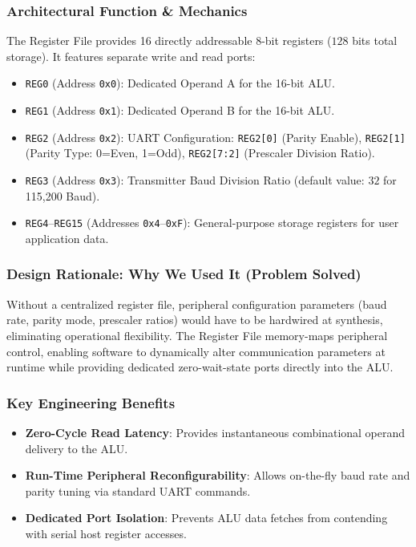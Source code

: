 \documentclass[11pt,a4paper]{article}
\begin{document}
\subsubsection{Architectural Function \& Mechanics}
The Register File provides 16 directly addressable 8-bit registers ($128$ bits total storage). It features separate write and read ports:
\begin{itemize}
    \item \texttt{REG0} (Address \texttt{0x0}): Dedicated Operand A for the 16-bit ALU.
    \item \texttt{REG1} (Address \texttt{0x1}): Dedicated Operand B for the 16-bit ALU.
    \item \texttt{REG2} (Address \texttt{0x2}): UART Configuration: \texttt{REG2[0]} (Parity Enable), \texttt{REG2[1]} (Parity Type: 0=Even, 1=Odd), \texttt{REG2[7:2]} (Prescaler Division Ratio).
    \item \texttt{REG3} (Address \texttt{0x3}): Transmitter Baud Division Ratio (default value: $32$ for 115,200 Baud).
    \item \texttt{REG4}--\texttt{REG15} (Addresses \texttt{0x4}--\texttt{0xF}): General-purpose storage registers for user application data.
\end{itemize}

\subsubsection{Design Rationale: Why We Used It (Problem Solved)}
Without a centralized register file, peripheral configuration parameters (baud rate, parity mode, prescaler ratios) would have to be hardwired at synthesis, eliminating operational flexibility. The Register File memory-maps peripheral control, enabling software to dynamically alter communication parameters at runtime while providing dedicated zero-wait-state ports directly into the ALU.

\subsubsection{Key Engineering Benefits}
\begin{itemize}
    \item \textbf{Zero-Cycle Read Latency}: Provides instantaneous combinational operand delivery to the ALU.
    \item \textbf{Run-Time Peripheral Reconfigurability}: Allows on-the-fly baud rate and parity tuning via standard UART commands.
    \item \textbf{Dedicated Port Isolation}: Prevents ALU data fetches from contending with serial host register accesses.
\end{itemize}
\end{document}

